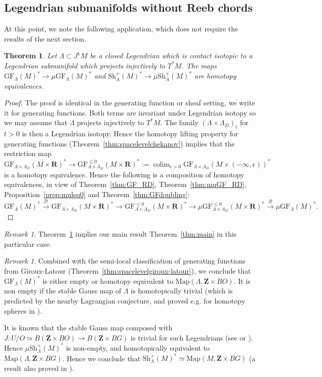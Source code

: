 \documentclass[12pt,a4paper]{article}
\numberwithin{equation}{section}
\newtheorem{thm}[equation]{Theorem}
\theoremstyle{definition}
\theoremstyle{remark}
\newtheorem{rem}[equation]{Remark}
\newcommand{\Z}{\mathbf{Z}}
\newcommand{\R}{\mathbf{R}}
\newcommand{\DD}{\mathcal{D}}
\newcommand{\RR}{\mathcal{R}}
\newcommand{\Map}{\mathrm{Map}}
\newcommand{\Sh}{\mathrm{Sh}}
\DeclareMathOperator{\colim}{colim}
\newcommand{\GF}{\mathrm{GF}}
\begin{document}
\subsection{Legendrian submanifolds without Reeb chords}
At this point, we note the following application, which does not require
the results of the next section.

\begin{thm}\label{thm:nochords}
Let $\Lambda\subset J^1 M$ be a closed Legendrian which is contact isotopic to a Legendrian submanifold which projects injectively to $T^* M$.
The maps $\GF_\Lambda(M)^*\to \mu \GF_\Lambda(M)^*$ and $\Sh^+_\Lambda(M)^*\to \mu\Sh^+_\Lambda(M)^*$ are homotopy equivalences.
\end{thm}
\begin{proof}
The proof is identical in the generating function or sheaf setting, we write it for generating functions.
Both terms are invariant under Legendrian isotopy so we may assume that $\Lambda$ projects injectively to $T^*M$.
The family $(\Lambda\times \Lambda_D)_t$ for $t>0$ is then a Legendrian isotopy. Hence the homotopy lifting property
for generating functions (Theorem~\ref{thm:spacelevelchekanov}) implies that the restriction map
$$\GF_{\Lambda\times \Lambda_D}(M \times \R)^* \to \GF^{\leq 0}_{\Lambda\times \Lambda_D}(M\times \R)^* :=\colim_{\epsilon >0} \GF_{\Lambda\times \Lambda_D}(M\times (-\infty,\epsilon))^*$$
is a homotopy equivalence. Hence the following is a composition of homotopy equivalences, in view of Theorem~\ref{thm:GF_RD}, Theorem~\ref{thm:muGF_RD},
Proposition~\ref{prop:muleq0} and Theorem~\ref{thm:GFdoubling}:
\[\GF_\Lambda(M)^* \xrightarrow{\DD} \GF_{\Lambda\times \Lambda_D}(M\times \R)^* \to \GF^{\leq 0}_{\Lambda\times \Lambda_D}(M\times \R)^* \to \mu \GF_{\Lambda\times \Lambda_D}^{\leq 0}(M\times \R)^* \xrightarrow{\RR} \mu \GF_\Lambda(M)^*.\]
\end{proof}
\begin{rem}
Theorem~\ref{thm:nochords} implies our main result Theorem~\ref{thm:main} in this particular case.
\end{rem}
\begin{rem}
Combined with the semi-local classification of generating functions from Giroux-Latour (Theorem~\ref{thm:spacelevelgiroux-latour}), we conclude that $\GF_\Lambda(M)^*$
is either empty or homotopy equivalent to $\Map(\Lambda,\Z\times BO)$.
It is non empty if the stable Gauss map of $\Lambda$ is homotopically trivial (which is predicted by
the nearby Lagrangian conjecture, and proved e.g. for homotopy spheres in \cite{ACGK}).

It is known that the stable Gauss map composed with $J:U/O\simeq B(\Z\times BO)\to B(\Z\times BG)$ is trivial
for such Legendrians (see \cite{Jin} or \cite{AACK}). Hence $\mu\Sh^+_\Lambda(M)^*$ is non-empty, and homotopically equivalent to $\Map(\Lambda,\Z\times BG)$.
Hence we conclude that $\Sh^+_\Lambda(M)^*\simeq \Map(M,\Z\times BG)$ (a result also proved in \cite{Jin-Treumann}).
\end{rem}
\end{document}
